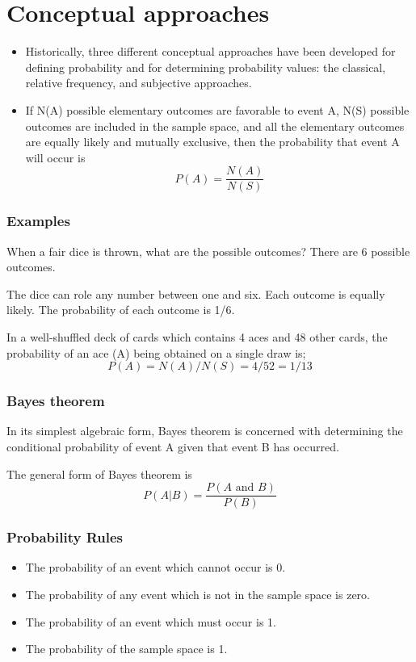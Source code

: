\documentclass[IntroMain.tex]{subfiles}
\begin{document}
	
	\section*{Conceptual approaches}
	\begin{frame}
		\Large
		\begin{itemize}
			\item Historically, three different conceptual approaches have been developed for defining probability and for
			determining probability values: the classical, relative frequency, and subjective approaches.\item If N(A) possible elementary outcomes are favorable to event A,
			N(S) possible outcomes are included in the sample space, and all the elementary outcomes are equally likely and
			mutually exclusive, then the probability that event A will occur is
			\[P(A) = \frac{N(A)}{N(S)}\]
		\end{itemize}
	\end{frame}
	\begin{frame} \frametitle{Examples}
		\Large
		When a fair dice is thrown, what are the possible outcomes? There are 6 possible outcomes. 
		
		The dice can role any number between one and six. Each outcome is equally likely. The probability of each outcome is 1/6.
	\end{frame}
	\begin{frame} 
		
		\Large
		In a well-shuffled deck of cards which contains 4 aces and 48 other cards, the probability of an ace (A)
		being obtained on a single draw is;
		\[ P(A)= N(A)/ N(S) = 4/52 = 1/13 \]
	\end{frame}
	\begin{frame} 
		
		\frametitle{Bayes theorem}
		\Large
		In its simplest algebraic form, Bayes theorem is concerned with determining the conditional probability of
		event A given that event B has occurred. 
		
		The general form of Bayes theorem is
		\[ P(A|B) =
		\frac{P(A \mbox{ and }B)}{P(B)} \]
	\end{frame}
	\begin{frame}
		\frametitle{Probability Rules}
		\begin{itemize}
			
			\item The probability of an event which cannot occur is 0.
			
			\item The probability of any event which is not in the sample space is zero.
			
			\item The probability of an event which must occur is 1.
			
			\item The probability of the sample space is 1.
		\end{itemize}
	\end{frame}
\end{document}
